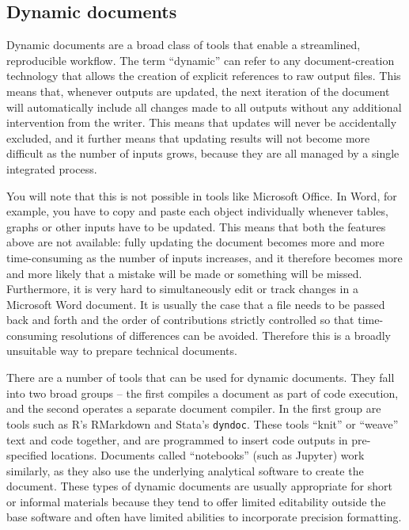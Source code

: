\subsection{Dynamic documents}

Dynamic documents are a broad class of tools that enable a streamlined, reproducible workflow.
The term ``dynamic'' can refer to any document-creation technology
that allows the creation of explicit references to raw output files.
This means that, whenever outputs are updated,
the next iteration of the document will automatically include
all changes made to all outputs without any additional intervention from the writer.
This means that updates will never be accidentally excluded,
and it further means that updating results will not become more difficult
as the number of inputs grows,
because they are all managed by a single integrated process.

You will note that this is not possible in tools like Microsoft Office.
In Word, for example, you have to copy and paste each object individually
whenever tables, graphs or other inputs have to be updated.
This means that both the features above are not available:
fully updating the document becomes more and more time-consuming
as the number of inputs increases,
and it therefore becomes more and more likely
that a mistake will be made or something will be missed.
Furthermore, it is very hard to simultaneously edit or track changes
in a Microsoft Word document.
It is usually the case that a file needs to be passed back and forth
and the order of contributions strictly controlled
so that time-consuming resolutions of differences can be avoided.
Therefore this is a broadly unsuitable way to prepare technical documents.

There are a number of tools that can be used for dynamic documents.
They fall into two broad groups --
the first compiles a document as part of code execution,
and the second operates a separate document compiler.
In the first group are tools such as R's RMarkdown
and Stata's \texttt{dyndoc}.
These tools ``knit'' or ``weave'' text and code together,
and are programmed to insert code outputs in pre-specified locations.
Documents called ``notebooks'' (such as Jupyter) work similarly,
as they also use the underlying analytical software to create the document.
These types of dynamic documents are usually appropriate for short or informal materials
because they tend to offer limited editability outside the base software
and often have limited abilities to incorporate precision formatting.

